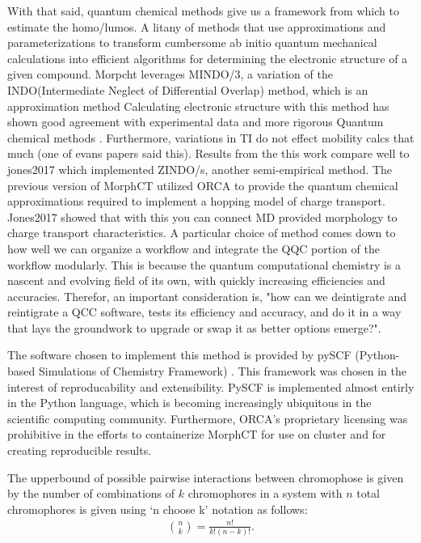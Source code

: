 With that said, quantum chemical methods give us a framework from which to estimate the homo/lumos. A litany of
methods that use approximations and parameterizations to transform cumbersome ab initio quantum mechanical 
calculations into efficient algorithms for determining the electronic structure of a given compound. Morpcht 
leverages MINDO/3, a variation of the INDO(Intermediate Neglect of Differential Overlap) method,
which is an approximation method Calculating electronic structure with this method has
shown good agreement with experimental data and more rigorous Quantum chemical
methods 
\cite{Bredas2002}. Furthermore, variations in TI do not effect mobility calcs
that much (one of evans papers said this).  Results
from the this work compare well to jones2017 which implemented ZINDO/s, another
semi-empirical method. The
previous version of MorphCT utilized ORCA \cite{Neese2012b}to provide the quantum chemical
approximations required to implement
a hopping model of charge transport. Jones2017 showed that with this you can connect MD
provided morphology to charge transport characteristics. A particular 
choice of method comes down to how well we can organize a workflow and integrate the QQC portion of the
workflow modularly. This is because the quantum computational chemistry is a nascent and evolving field of its
own, with quickly increasing efficiencies and accuracies. Therefor, an important consideration is, "how can we
deintigrate and reintigrate a QCC software, tests its efficiency and accuracy, and do it in a way that lays
the groundwork to upgrade or swap it as better options emerge?". 

The software chosen to implement this method is
provided by pySCF (Python-based Simulations of Chemistry Framework) \cite{Sun2018a}. This framework
was chosen in the interest of reproducability and extensibility. PySCF is implemented almost entirly in the Python 
language, which is becoming increasingly ubiquitous in the scientific computing community. Furthermore,
ORCA's proprietary licensing was prohibitive in the efforts to containerize MorphCT for use on cluster and for
creating reproducible results. 

The upperbound of possible pairwise interactions between chromophose is given by the number of combinations of
$k$ chromophores in a system with $n$ total chromophores is given using `n choose k' notation as follows:
\begin{align}
    {n \choose k} =  \frac{n!}{k!(n-k)!}.
\end{align}

